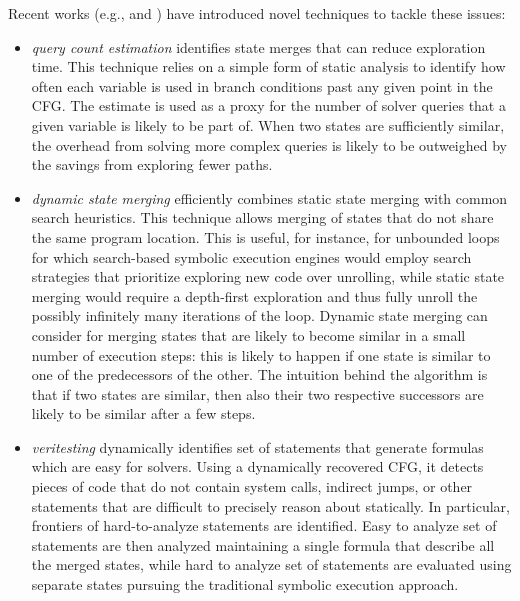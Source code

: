 Recent works (e.g., \cite{KKB-PLDI12} and \cite{VERITESTING-ICSE14}) have introduced novel techniques to tackle these issues: 
\begin{itemize}

  \item {\em query count estimation} identifies state merges that can reduce exploration time. This technique relies on a simple form of static analysis to identify how often each variable is used in branch conditions past any given point in the CFG. The estimate is used as a proxy for the number of solver queries that a given variable is likely to be part of. When two states are sufficiently similar, the overhead from solving more complex queries is likely to be outweighed by the savings from exploring fewer paths.

  \item {\em dynamic state merging} efficiently combines static state merging with common search heuristics. This technique allows merging of states that do not share the same program location. This is useful, for instance, for unbounded loops for which search-based symbolic execution engines would employ search strategies that prioritize exploring new code over unrolling, while static state merging would require a depth-first exploration and thus fully unroll the possibly infinitely many iterations of the loop. Dynamic state merging can consider for merging states that are likely to become similar in a small number of execution steps: this is likely to happen if one state is similar to one of the predecessors of the other. The intuition behind the algorithm is that if two states are similar, then also their two respective successors are likely to be similar after a few steps.

  \item {\em veritesting} dynamically identifies set of statements that generate formulas which are easy for solvers. Using a dynamically recovered CFG, it detects pieces of code that do not contain system calls, indirect jumps, or other statements that are difficult to precisely reason about statically. In particular, frontiers of hard-to-analyze statements are identified. Easy to analyze set of statements are then analyzed maintaining a single formula that describe all the merged states, while hard to analyze set of statements are evaluated using separate states pursuing the traditional symbolic execution approach.

\end{itemize}

